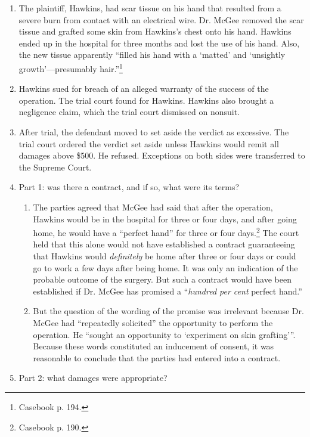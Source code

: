 \begin{enumerate}
    \item The plaintiff, Hawkins, had scar tissue on his hand that resulted 
    from a severe burn from contact with an electrical wire. Dr. McGee removed 
    the scar tissue and grafted some skin from Hawkins's chest onto his hand. 
    Hawkins ended up in the hospital for three months and lost the use of his 
    hand. Also, the new tissue apparently ``filled his hand with a `matted' 
    and `unsightly growth'---presumably hair.''\footnote{Casebook p. 194.}
    \item Hawkins sued for breach of an alleged warranty of the success of the 
    operation. The trial court found for Hawkins. Hawkins also brought a 
    negligence claim, which the trial court dismissed on nonsuit.
    \item After trial, the defendant moved to set aside the verdict as 
    excessive. The trial court ordered the verdict set aside unless Hawkins 
    would remit all damages above \$500. He refused. Exceptions on both sides 
    were transferred to the Supreme Court.
    \item Part 1: was there a contract, and if so, what were its terms?
    \begin{enumerate}
        \item The parties agreed that McGee had said that after the operation, 
        Hawkins would be in the hospital for three or four days, and after 
        going home, he would have a ``perfect hand'' for three or four 
        days.\footnote{Casebook p. 190.} The court held that this alone would 
        not have established a contract guaranteeing that Hawkins would 
        \emph{definitely} be home after three or four days or could go to work 
        a few days after being home. It was only an indication of the probable 
        outcome of the surgery. But such a contract would have been 
        established if Dr. McGee has promised a ``\emph{hundred per cent} 
        perfect hand.''
        \item But the question of the wording of the promise was irrelevant 
        because Dr. McGee had ``repeatedly solicited'' the opportunity to 
        perform the operation. He \enquote{sought an opportunity to 
        `experiment on skin grafting'}. Because these words constituted an 
        inducement of consent, it was reasonable to conclude that the parties 
        had entered into a contract.
    \end{enumerate}
    \item Part 2: what damages were appropriate?

\end{enumerate}
